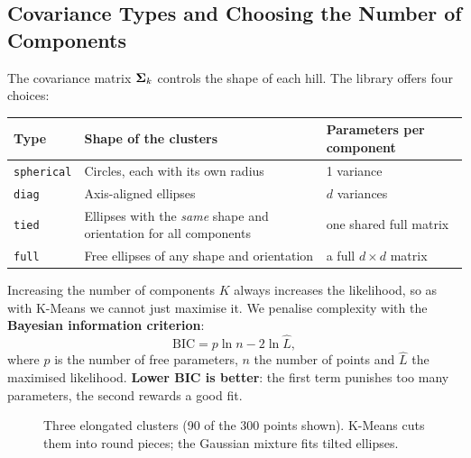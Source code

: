 \subsection{Covariance Types and Choosing the Number of Components}

The covariance matrix $\boldsymbol{\Sigma}_k$ controls the shape of each hill. The library offers four choices:

\begin{center}
\begin{tabular}{@{}p{2.4cm}p{6.1cm}p{5.2cm}@{}}
\toprule
\textbf{Type} & \textbf{Shape of the clusters} & \textbf{Parameters per component}\\
\midrule
\texttt{spherical} & Circles, each with its own radius & 1 variance\\
\texttt{diag} & Axis-aligned ellipses & $d$ variances\\
\texttt{tied} & Ellipses with the \emph{same} shape and orientation for all components & one shared full matrix\\
\texttt{full} & Free ellipses of any shape and orientation & a full $d\times d$ matrix\\
\bottomrule
\end{tabular}
\end{center}

Increasing the number of components $K$ always increases the likelihood, so as with K-Means we cannot just maximise it. We penalise complexity with the \textbf{Bayesian information criterion}:
\[
  \text{BIC}=p\ln n-2\ln\hat L,
\]
where $p$ is the number of free parameters, $n$ the number of points and $\hat L$ the maximised likelihood. \textbf{Lower BIC is better}: the first term punishes too many parameters, the second rewards a good fit.

\begin{figure}[!htbp]
\centering
{}
\caption{Three elongated clusters (90 of the 300 points shown). K-Means cuts them into round pieces; the Gaussian mixture fits tilted ellipses.}\label{fig:gmm}
\end{figure}

